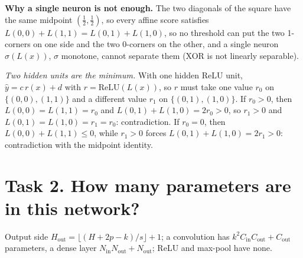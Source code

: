 \textbf{Why a single neuron is not enough.} The two diagonals of the square have the same midpoint $(\tfrac12,\tfrac12)$, so every
affine score satisfies $L(0,0)+L(1,1)=L(0,1)+L(1,0)$, so no threshold can put the two 1-corners on one side and the two
0-corners on the other, and a single neuron $\sigma(L(x))$, $\sigma$ monotone, cannot separate them (XOR is not linearly separable).

\emph{Two hidden units are the minimum.} With one hidden ReLU unit, $\hat y=c\,r(x)+d$ with $r=\mathrm{ReLU}(L(x))$, so $r$
must take one value $r_0$ on $\{(0,0),(1,1)\}$ and a different value $r_1$ on $\{(0,1),(1,0)\}$. If $r_0>0$, then $L(0,0)=L(1,1)=r_0$
and $L(0,1)+L(1,0)=2r_0>0$, so $r_1>0$ and $L(0,1)=L(1,0)=r_1=r_0$: contradiction. If $r_0=0$, then
$L(0,0)+L(1,1)\le 0$, while $r_1>0$ forces $L(0,1)+L(1,0)=2r_1>0$: contradiction with the midpoint identity.

\section*{Task 2. How many parameters are in this network?}
Output side $H_\text{out}=\lfloor (H+2p-k)/s\rfloor+1$; a convolution has $k^2C_\text{in}C_\text{out}+C_\text{out}$ parameters,
a dense layer $N_\text{in}N_\text{out}+N_\text{out}$; ReLU and max-pool have none.

